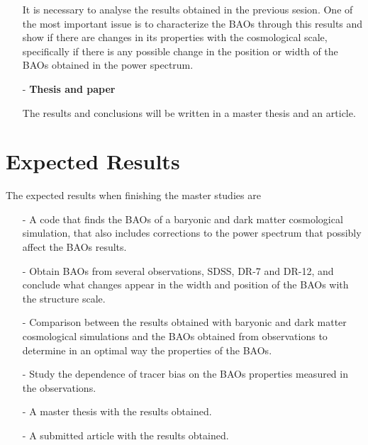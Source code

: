 \documentclass[a4,useAMS,usenatbib,usegraphicx,12pt]{article}
\begin{document}
\begin{itemize}
It is necessary to analyse the results obtained in the 
previous sesion. One of the most important 
issue is to characterize the BAOs through this results and show if there are changes in its properties  
with the cosmological scale, specifically if there is any possible change in the position or 
width of the BAOs obtained in the power spectrum.  

\item[-] \textbf{ Thesis and paper } 

The results and conclusions will be written in  a master thesis and 
an article. 

\end{itemize}

\section{Expected Results}

The expected results when finishing the master studies are 

\begin{itemize}

\item[-] A code that finds the BAOs of a baryonic  and  dark matter cosmological simulation, that also includes 
corrections to the power spectrum that possibly affect the BAOs results. 

\item[-] Obtain BAOs from several observations, SDSS, DR-7 and DR-12, and conclude what changes appear 
in the width and position of the BAOs with the structure scale. 

\item[-] Comparison between the results obtained with baryonic  and  dark matter cosmological simulations
and the BAOs obtained from observations to determine in an optimal way the properties of the BAOs.  

\item[-] Study the dependence of tracer bias on the BAOs properties measured in the observations. 

\item[-] A master thesis with the results obtained. 

\item[-] A submitted article with the results obtained.  

\end{itemize}
\end{document}
